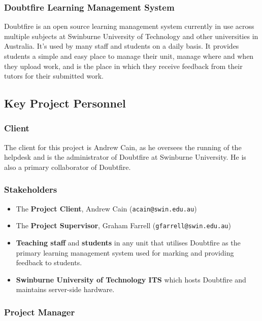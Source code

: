 \documentclass[a4paper,12pt]{article}
\providecommand{\tightlist}{%
  \setlength{\itemsep}{0pt}\setlength{\parskip}{0pt}}
\begin{document}
\subsubsection{Doubtfire Learning Management
System}\label{doubtfire-learning-management-system}

Doubtfire is an open source learning management system currently in use
across multiple subjects at Swinburne University of Technology and other
universities in Australia. It's used by many staff and students on a
daily basis. It provides students a simple and easy place to manage
their unit, manage where and when they upload work, and is the place in
which they receive feedback from their tutors for their submitted work.

\subsection{Key Project Personnel}\label{key-project-personnel}

\subsubsection{Client}\label{client}

The client for this project is Andrew Cain, as he oversees the running
of the helpdesk and is the administrator of Doubtfire at Swinburne
University. He is also a primary collaborator of Doubtfire.

\subsubsection{Stakeholders}\label{stakeholders}

\begin{itemize}
\tightlist
\item
  The \textbf{Project Client}, Andrew Cain (\texttt{acain@swin.edu.au})
\item
  The \textbf{Project Supervisor}, Graham Farrell
  (\texttt{gfarrell@swin.edu.au})
\item
  \textbf{Teaching staff} and \textbf{students} in any unit that
  utilises Doubtfire as the primary learning management system used for
  marking and providing feedback to students.
\item
  \textbf{Swinburne University of Technology ITS} which hosts Doubtfire
  and maintains server-side hardware.
\end{itemize}

\subsubsection{Project Manager}\label{project-manager}
\end{document}
